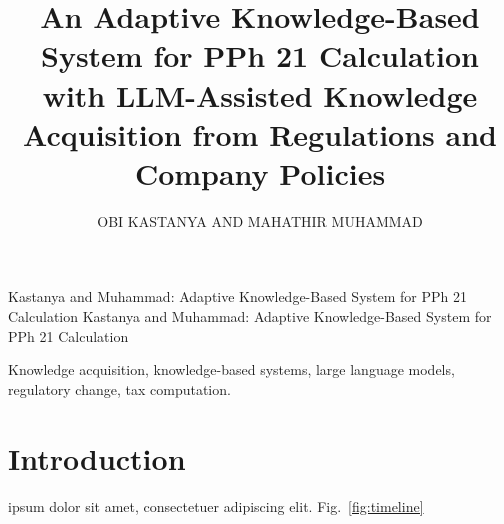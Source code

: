\documentclass{ieeeaccess}
\begin{document}

\title{An Adaptive Knowledge-Based System for PPh 21 Calculation with LLM-Assisted Knowledge Acquisition from Regulations and Company Policies}

\author{\uppercase{Obi Kastanya}
AND \uppercase{Mahathir Muhammad}}

\address[1]{Department of Informatics, Institut Teknologi Sepuluh Nopember, Surabaya 60111, Indonesia
(e-mail: 6025252015@student.its.ac.id; 6025252008@student.its.ac.id)}

\markboth
{Kastanya and Muhammad: Adaptive Knowledge-Based System for PPh 21 Calculation}
{Kastanya and Muhammad: Adaptive Knowledge-Based System for PPh 21 Calculation}


\begin{abstract}
\lipsum[1][1-12]
\end{abstract}

\begin{keywords}
Knowledge acquisition, knowledge-based systems, large language models, regulatory change, tax computation.
\end{keywords}

\titlepgskip=-21pt

\maketitle

\section{Introduction}
\lipsum[93] %

 ipsum dolor sit amet, consectetuer adipiscing elit. \lipsum[2][2-9] \lipsum[3] Fig.~\ref{fig:timeline} \lipsum[4][1-4]
\end{document}
